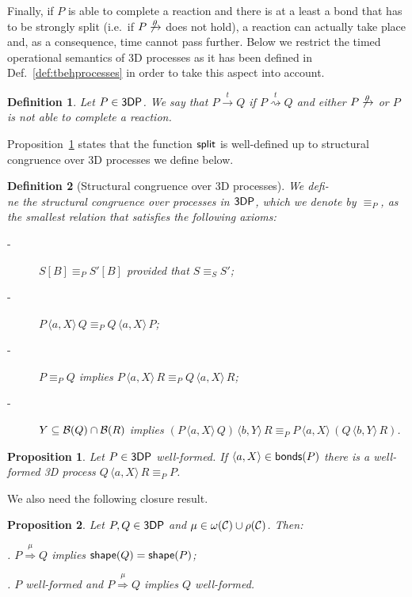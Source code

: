 \documentclass[11pt]{article}
\newcommand{\bonds}{{\sf bonds}}
\newcommand{\Split}{{\sf split}}
\newcommand{\proc}{\sf{3DP}}
\newcommand{\channels}{{\cal C}}
\newcommand{\unionc}[1]{\,\langle #1 \rangle\,}
\newcommand{\nar}[1]{\xrightarrow{#1}}
\newcommand{\wnar}[1]{\stackrel{#1}{\rightsquigarrow}}
\newcommand{\dnar}[1]{\stackrel{#1}{\Rightarrow}}
\newcommand{\shape}{{\sf shape}}
\newcommand{\boundary}[1]{\ensuremath{{\cal B}(#1)}}
\newtheorem{definition}{Definition}
\newtheorem{proposition}{Proposition}
\begin{document}
Finally, if $P$ is able to complete a reaction and there is at a least a bond that has to be
strongly split (i.e.\ if $P \not\nar{\rho}$ does not hold), a reaction can actually take place
and, as a consequence, time cannot pass further. Below we restrict the timed operational
semantics of 3D processes as it has been defined in Def.~\ref{def:tbehprocesses} in order to take
this aspect into account.

\begin{definition}\label{def:strong-timed-behaviour}
Let $P\in\proc$. We say that $P \nar{t} Q$ if $P \wnar{t} Q$ and either $P \not\nar{\rho}$ or $P$
is {\em not} able to complete a reaction.
\end{definition}

\noindent Proposition~\ref{prop:splitwf} states that the function $\Split$ is well-defined up to
structural congruence over 3D processes we define below.

\begin{definition}[Structural congruence over 3D processes] \label{def:congruence3d}
We defi-\\ne the structural congruence over processes in $\proc$, which we denote by
$\equiv_P$, as the smallest relation that satisfies the following axioms:
\begin{description}

\item [-] $S[B] \equiv_P S'[B]$  provided that $S \equiv_S S'$;

\item [-] $P \unionc{a,X} Q  \equiv_P Q \unionc{a,X} P$;

\item [-] $P \equiv_P Q$ implies $P \unionc{a,X} R  \equiv_P Q \unionc{a,X} R$;

\item  [-] $Y \subseteq \boundary{Q} \cap \boundary{R}$ implies $(P \unionc{a,X} Q) \unionc{b, Y} R \equiv_P P \unionc{a,X} (Q \unionc{b, Y} R)$.
\end{description}
\end{definition}
\begin{proposition}\label{prop:splitwf}
Let $P \in \proc$ well-formed. If $\langle a, X \rangle \in \bonds(P)$ there is a well-formed 3D
process $Q \unionc{a, X} R \equiv_P P$.
\end{proposition}
We also need the following closure result.
\begin{proposition}\label{prop:closure-splittings}
Let $P, Q\in \proc$  and $\mu \in \omega(\channels) \cup \rho(\channels)$. Then:

. $P \dnar{\mu} Q$ implies $\shape(Q) = \shape(P)$;

. $P$ well-formed and $P\dnar{\mu} Q$ implies $Q$ well-formed.
\end{proposition}
\end{document}
